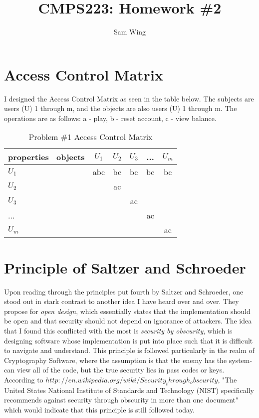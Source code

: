 \documentclass[11pt]{amsart}
\title{CMPS223: Homework \#2}
\author{Sam Wing}
\begin{document}
\maketitle
\section{Access Control Matrix}

I designed the Access Control Matrix as seen in the table below.  The subjects are users (U) 1 through m, and the objects are also users (U) 1 through m.  The operations are as follows: a - play, b - reset account, c - view balance. 

\begin{table}[h]
\centering
\begin{tabular}{| l | c | c | c | c | c |}
\hline
properties \ objects  & $U_1$ & $U_2$ & $U_3$ & ...  & $U_m$ \\ \hline
$U_1$ & abc & bc & bc & bc  & bc \\ \hline
$U_2$ &  & ac &  &   &  \\ \hline
$U_3$ &  &  & ac &   &  \\ \hline
... &  &  &  &  ac &  \\ \hline
$U_m$ &  &  &  &   &  ac \\ \hline
\end{tabular}
\caption{Problem \#1 Access Control Matrix}
\label{acl}
\end{table}

\section{Principle of Saltzer and Schroeder}
Upon reading through the principles put fourth by Saltzer and Schroeder, one stood out in stark contrast to another idea I have heard over and over.  They propose for \emph{open design}, which essentially states that the implementation should be open and that security should not depend on ignorance of attackers.  The idea that I found this conflicted with the most is \emph{security by obscurity}, which is designing software whose implementation is put into place such that it is difficult to navigate and understand.  This principle is followed particularly in the realm of Cryptography Software, where the assumption is that the enemy has the system- can view all of the code, but the true security lies in pass codes or keys.  According to $http://en.wikipedia.org/wiki/Security_through_obscurity$, "The United States National Institute of Standards and Technology (NIST) specifically recommends against security through obscurity in more than one document"  which would indicate that this principle is still followed today.
\end{document}
